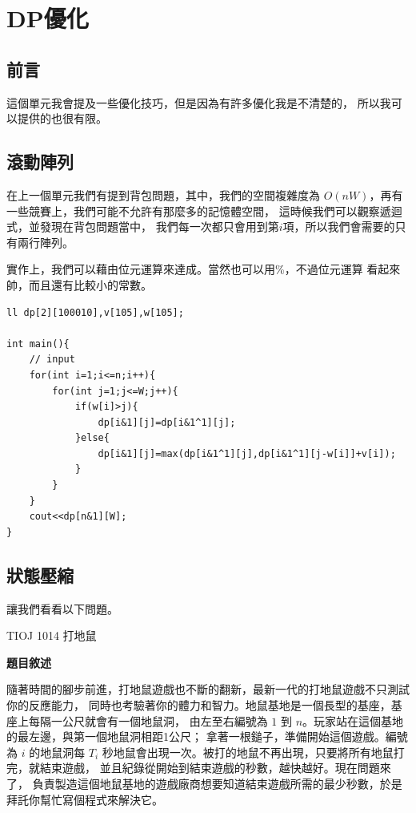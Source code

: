 \section{DP優化}
    \subsection{前言}
    這個單元我會提及一些優化技巧，但是因為有許多優化我是不清楚的，
    所以我可以提供的也很有限。

    \subsection{滾動陣列}
    在上一個單元我們有提到背包問題，其中，我們的空間複雜度為
    $O(nW)$，再有一些競賽上，我們可能不允許有那麼多的記憶體空間，
    這時候我們可以觀察遞迴式，並發現在背包問題當中，
    我們每一次都只會用到第$i$項，所以我們會需要的只有兩行陣列。

    實作上，我們可以藉由位元運算來達成。當然也可以用\%，不過位元運算
    看起來帥，而且還有比較小的常數。

\begin{lstlisting}[caption=01背包]
ll dp[2][100010],v[105],w[105];

int main(){
    // input
    for(int i=1;i<=n;i++){
        for(int j=1;j<=W;j++){
            if(w[i]>j){
                dp[i&1][j]=dp[i&1^1][j];
            }else{
                dp[i&1][j]=max(dp[i&1^1][j],dp[i&1^1][j-w[i]]+v[i]);
            }
        }
    }
    cout<<dp[n&1][W];
}
\end{lstlisting}

    \subsection{狀態壓縮}
    讓我們看看以下問題。

    \example TIOJ 1014  打地鼠

    \textbf{題目敘述}

    隨著時間的腳步前進，打地鼠遊戲也不斷的翻新，最新一代的打地鼠遊戲不只測試你的反應能力，
    同時也考驗著你的體力和智力。地鼠基地是一個長型的基座，基座上每隔一公尺就會有一個地鼠洞，
    由左至右編號為 $1$ 到 $n$。玩家站在這個基地的最左邊，與第一個地鼠洞相距1公尺；
    拿著一根鎚子，準備開始這個遊戲。編號為 $i$ 的地鼠洞每 $T_i$
    秒地鼠會出現一次。被打的地鼠不再出現，只要將所有地鼠打完，就結束遊戲，
    並且紀錄從開始到結束遊戲的秒數，越快越好。現在問題來了，
    負責製造這個地鼠基地的遊戲廠商想要知道結束遊戲所需的最少秒數，於是拜託你幫忙寫個程式來解決它。

